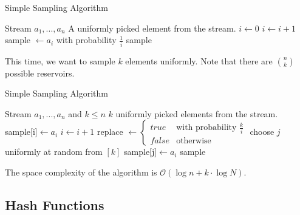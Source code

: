 \documentclass[english]{panikzettel}
\begin{document}
\begin{halfboxl}
\vspace{-\baselineskip}

\begin{algo}{Simple Sampling Algorithm}
{
\renewcommand{\algorithmicrequire}{\textbf{Input:}}
\renewcommand{\algorithmicensure}{\textbf{Output:}}
  \begin{algorithmic}[1]
  \Require Stream $a_1,...,a_n$ %
  \Ensure A uniformly picked element from the stream.
  \State $i\leftarrow 0$
    \State $i\leftarrow i+1$
    \State sample $\leftarrow a_i$ with probability $\frac{1}{i}$ %
  \EndWhile
  \State \Return sample
  \end{algorithmic}
}
\end{algo}

This time, we want to sample $k$ elements uniformly.
Note that there are $\binom{n}{k}$ possible reservoirs.

\end{halfboxl}
\begin{halfboxr}
\vspace{-\baselineskip}

\begin{algo}{Simple Sampling Algorithm}
{
\renewcommand{\algorithmicrequire}{\textbf{Input:}}
\renewcommand{\algorithmicensure}{\textbf{Output:}}
  \begin{algorithmic}[1]
  \Require Stream $a_1,...,a_n$ and $k\leq n$
  \Ensure $k$ uniformly picked elements from the stream.
  \State sample[i]$\leftarrow a_i$ %
  \EndFor
    \State $i\leftarrow i+1$
    \State replace $\leftarrow\begin{cases}
    true & \text{with probability } \frac{k}{i}\\
    false & \text{otherwise}
    \end{cases}$
    \State choose $j$ uniformly at random from $[k]$
    \State sample[j]$\leftarrow a_i$
    \EndIf
  \EndWhile
  \State \Return sample
  \end{algorithmic}
}
\end{algo}

\end{halfboxr}

The space complexity of the algorithm is $\mathcal{O}(\log n + k\cdot \log N)$.

\subsection{Hash Functions}
\end{document}
